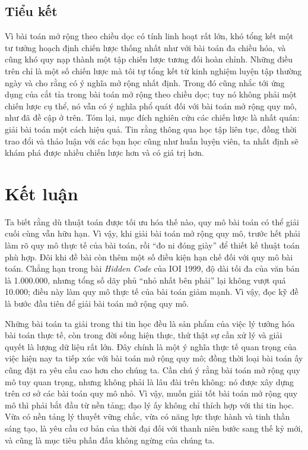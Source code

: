 \documentclass[11pt]{article}
\begin{document}
\subsection{Tiểu kết}

Vì bài toán mở rộng theo chiều dọc có tính linh hoạt rất lớn, khó tổng kết
một tư tưởng hoạch định chiến lược thống nhất như với bài toán đa chiều hóa,
và cũng khó quy nạp thành một tập chiến lược tương đối hoàn chỉnh. Những điều
trên chỉ là một số chiến lược mà tôi tự tổng kết từ kinh nghiệm luyện tập
thường ngày và cho rằng có ý nghĩa mở rộng nhất định. Trong đó cũng nhắc tới
ứng dụng của cắt tỉa trong bài toán mở rộng theo chiều dọc; tuy nó không phải
một chiến lược cụ thể, nó vẫn có ý nghĩa phổ quát đối với bài toán mở rộng
quy mô, như đã đề cập ở trên. Tóm lại, mục đích nghiên cứu các chiến lược là
nhất quán: giải bài toán một cách hiệu quả. Tin rằng thông qua học tập liên
tục, đồng thời trao đổi và thảo luận với các bạn học cũng như huấn luyện
viên, ta nhất định sẽ khám phá được nhiều chiến lược hơn và có giá trị hơn.

\section{Kết luận}

Ta biết rằng dù thuật toán được tối ưu hóa thế nào, quy mô bài toán có thể
giải cuối cùng vẫn hữu hạn. Vì vậy, khi giải bài toán mở rộng quy mô, trước
hết phải làm rõ quy mô thực tế của bài toán, rồi ``đo ni đóng giày'' để thiết
kế thuật toán phù hợp. Đôi khi đề bài còn thêm một số điều kiện hạn chế đối
với quy mô bài toán. Chẳng hạn trong bài \textit{Hidden Code} của IOI 1999,
độ dài tối đa của văn bản là 1.000.000, nhưng tổng số dãy phủ ``nhỏ nhất bên
phải'' lại không vượt quá 10.000; điều này làm quy mô thực tế của bài toán
giảm mạnh. Vì vậy, đọc kỹ đề là bước đầu tiên để giải bài toán mở rộng quy
mô.

Những bài toán ta giải trong thi tin học đều là sản phẩm của việc lý tưởng
hóa bài toán thực tế, còn trong đời sống hiện thực, thứ thật sự cần xử lý và
giải quyết là lượng dữ liệu rất lớn. Đây chính là một ý nghĩa thực tế quan
trọng của việc hiện nay ta tiếp xúc với bài toán mở rộng quy mô; đồng thời
loại bài toán ấy cũng đặt ra yêu cầu cao hơn cho chúng ta. Cần chú ý rằng
bài toán mở rộng quy mô tuy quan trọng, nhưng không phải là lâu đài trên
không: nó được xây dựng trên cơ sở các bài toán quy mô nhỏ. Vì vậy, muốn giải
tốt bài toán mở rộng quy mô thì phải bắt đầu từ nền tảng; đạo lý ấy không
chỉ thích hợp với thi tin học. Vừa có nền tảng lý thuyết vững chắc, vừa có
năng lực thực hành và tinh thần sáng tạo, là yêu cầu cơ bản của thời đại đối
với thanh niên bước sang thế kỷ mới, và cũng là mục tiêu phấn đấu không ngừng
của chúng ta.
\end{document}
